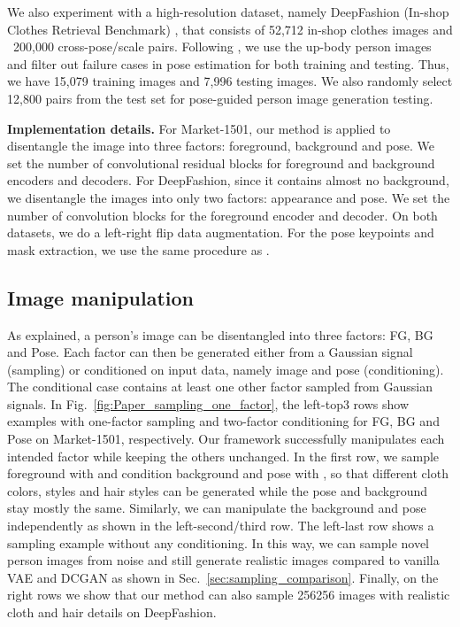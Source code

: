 \documentclass[10pt,twocolumn,letterpaper]{article}
\newcommand{\myparagraph}[1]{\vspace{0.0em}\noindent\textbf{#1}}
\begin{document}
We also experiment with a high-resolution dataset, namely DeepFashion (In-shop Clothes Retrieval Benchmark) \cite{DeepFashion}, that consists of 52,712 in-shop clothes images and ~200,000 cross-pose/scale pairs. 
Following \cite{PG2}, we use the up-body person images and filter out failure cases in pose estimation for both training and testing. 
Thus, we have 15,079 training images and 7,996 testing images. 
We also randomly select 12,800 pairs from the test set for pose-guided person image generation testing.

\myparagraph{Implementation details.}
For Market-1501, our method is applied to disentangle the image into three factors: foreground, background and pose.
We set the number of convolutional residual blocks  for foreground and background encoders and decoders. 
For DeepFashion, since it contains almost no background, we disentangle the images into only two factors: appearance and pose.
We set the number of convolution blocks  for the foreground encoder and decoder.
On both datasets, we do a left-right flip data augmentation.
For the pose keypoints and mask extraction, we use the same procedure as \cite{PG2}. 

\subsection{Image manipulation}
\vspace{-0.5mm}
As explained, a person's image can be disentangled into three factors: FG, BG and Pose. 
Each factor can then be generated either from a Gaussian signal (sampling) or conditioned on input data, namely image and pose (conditioning). 
The conditional case contains at least one other factor sampled from Gaussian signals.
In Fig.~\ref{fig:Paper_sampling_one_factor}, the left-top3 rows show examples with one-factor sampling and two-factor conditioning for FG, BG and Pose on Market-1501, respectively. 
Our framework successfully manipulates each intended factor while keeping the others unchanged. 
In the first row, we sample foreground with  and condition background and pose with , so that different cloth colors, styles and hair styles can be generated while the pose and background stay mostly the same. 
Similarly, we can manipulate the background and pose independently as shown in the left-second/third row.
The left-last row shows a sampling example without any conditioning. 
In this way, we can sample novel person images from noise and still generate realistic images compared to vanilla VAE and DCGAN as shown in Sec.~\ref{sec:sampling_comparison}. 
Finally, on the right rows we show that our method can also sample 256256 images with realistic cloth and hair details on DeepFashion.
\end{document}
